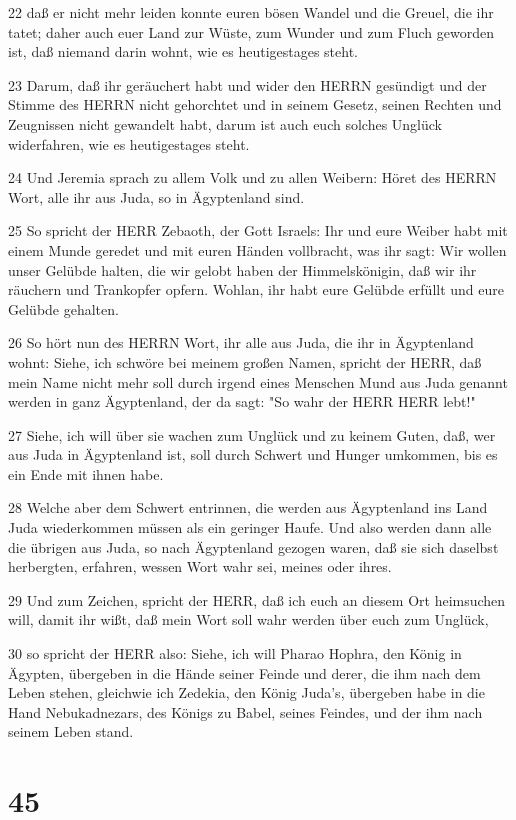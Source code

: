 \par 22 daß er nicht mehr leiden konnte euren bösen Wandel und die Greuel, die ihr tatet; daher auch euer Land zur Wüste, zum Wunder und zum Fluch geworden ist, daß niemand darin wohnt, wie es heutigestages steht.
\par 23 Darum, daß ihr geräuchert habt und wider den HERRN gesündigt und der Stimme des HERRN nicht gehorchtet und in seinem Gesetz, seinen Rechten und Zeugnissen nicht gewandelt habt, darum ist auch euch solches Unglück widerfahren, wie es heutigestages steht.
\par 24 Und Jeremia sprach zu allem Volk und zu allen Weibern: Höret des HERRN Wort, alle ihr aus Juda, so in Ägyptenland sind.
\par 25 So spricht der HERR Zebaoth, der Gott Israels: Ihr und eure Weiber habt mit einem Munde geredet und mit euren Händen vollbracht, was ihr sagt: Wir wollen unser Gelübde halten, die wir gelobt haben der Himmelskönigin, daß wir ihr räuchern und Trankopfer opfern. Wohlan, ihr habt eure Gelübde erfüllt und eure Gelübde gehalten.
\par 26 So hört nun des HERRN Wort, ihr alle aus Juda, die ihr in Ägyptenland wohnt: Siehe, ich schwöre bei meinem großen Namen, spricht der HERR, daß mein Name nicht mehr soll durch irgend eines Menschen Mund aus Juda genannt werden in ganz Ägyptenland, der da sagt: "So wahr der HERR HERR lebt!"
\par 27 Siehe, ich will über sie wachen zum Unglück und zu keinem Guten, daß, wer aus Juda in Ägyptenland ist, soll durch Schwert und Hunger umkommen, bis es ein Ende mit ihnen habe.
\par 28 Welche aber dem Schwert entrinnen, die werden aus Ägyptenland ins Land Juda wiederkommen müssen als ein geringer Haufe. Und also werden dann alle die übrigen aus Juda, so nach Ägyptenland gezogen waren, daß sie sich daselbst herbergten, erfahren, wessen Wort wahr sei, meines oder ihres.
\par 29 Und zum Zeichen, spricht der HERR, daß ich euch an diesem Ort heimsuchen will, damit ihr wißt, daß mein Wort soll wahr werden über euch zum Unglück,
\par 30 so spricht der HERR also: Siehe, ich will Pharao Hophra, den König in Ägypten, übergeben in die Hände seiner Feinde und derer, die ihm nach dem Leben stehen, gleichwie ich Zedekia, den König Juda's, übergeben habe in die Hand Nebukadnezars, des Königs zu Babel, seines Feindes, und der ihm nach seinem Leben stand.

\chapter{45}

